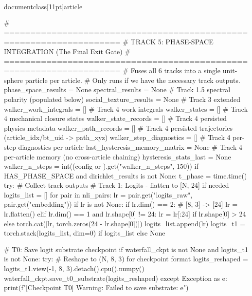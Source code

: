 \\documentclass[11pt]{article}
\begin{document}
\begin{CodeBlock}
        # ====================================================================
        # TRACK 5: PHASE-SPACE INTEGRATION (The Final Exit Gate)
        # ====================================================================
        # Fuses all 6 tracks into a single unit-sphere particle per article.
        # Only runs if we have the necessary track outputs.
        phase_space_results = None
        spectral_results = None  # Track 1.5 spectral polarity (populated below)
        social_texture_results = None  # Track 3 extended
        walker_work_integrals = []  # Track 4 work integrals
        walker_states = []  # Track 4 mechanical closure states
        walker_state_records = []  # Track 4 persisted physics metadata
        walker_path_records = []  # Track 4 persisted trajectories (article_idx/bt_uid -> path_xyz)
        walker_step_diagnostics = []  # Track 4 per-step diagnostics per article
        last_hysteresis_memory_matrix = None  # Track 4 per-article memory (no cross-article chaining)
        hysteresis_stats_last = None
        walker_n_steps = int((config or {}).get("walker_n_steps", 150))
        if HAS_PHASE_SPACE and dirichlet_results is not None:
            t_phase = time.time()
            try:
                # Collect track outputs
                # Track 1: Logits - flatten to [N, 24] if needed
                logits_list = []
                for pair in nli_pairs:
                    lr = pair.get("logits_raw", pair.get("embedding"))
                    if lr is not None:
                        if lr.dim() == 2:  # [8, 3] -> [24]
                            lr = lr.flatten()
                        elif lr.dim() == 1 and lr.shape[0] != 24:
                            lr = lr[:24] if lr.shape[0] > 24 else torch.cat([lr, torch.zeros(24 - lr.shape[0])])
                        logits_list.append(lr)
                logits_t1 = torch.stack(logits_list, dim=0) if logits_list else None

                # T0: Save logit substrate checkpoint
                if waterfall_ckpt is not None and logits_t1 is not None:
                    try:
                        # Reshape to (N, 8, 3) for checkpoint format
                        logits_reshaped = logits_t1.view(-1, 8, 3).detach().cpu().numpy()
                        waterfall_ckpt.save_t0_substrate(logits_reshaped)
                    except Exception as e:
                        print(f"[Checkpoint T0] Warning: Failed to save substrate: {e}")


\end{CodeBlock}
\end{document}
